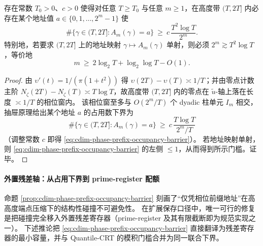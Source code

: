 \begin{proposition}[二次分辨率屏障的占用下界与单射门槛]\label{prop:cdim-phase-prefix-occupancy-barrier}
存在常数 \(T_0>0\)、\(c>0\) 使得对任意 \(T\ge T_0\) 与任意 \(m\ge 1\)，在高度带 \((T,2T]\) 内必存在某个地址值 \(a\in\{0,1,\dots,2^m-1\}\) 使
\begin{equation}\label{eq:cdim-phase-prefix-occupancy-barrier}
\#\{\gamma\in(T,2T]:A_m(\gamma)=a\}\ \ge\ c\,\frac{T^2\log T}{2^m}.
\end{equation}
特别地，若要求 \((T,2T]\) 上的地址映射 \(\gamma\mapsto A_m(\gamma)\) 单射，则必须 \(2^m\gtrsim T^2\log T\)，等价地
\[
m\ \ge\ 2\log_2T+\log_2\log T-O(1).
\]
\end{proposition}
\begin{proof}
由 \(\upsilon'(t)=1/(\pi(1+t^2))\) 得 \(\upsilon(2T)-\upsilon(T)\asymp 1/T\)；并由零点计数主阶 \(N_\zeta(2T)-N_\zeta(T)\asymp T\log T\)，故高度带 \((T,2T]\) 内的零点在 \(\widetilde u\)-轴上落在长度 \(\asymp 1/T\) 的相位窗内。
该相位窗至多与 \(O(2^m/T)\) 个 dyadic 柱单元 \(I_m\) 相交，抽屉原理给出某个地址 \(a\) 的占用数下界为
\[
\#\{\gamma\in(T,2T]:A_m(\gamma)=a\}\ \ge\ c\,\frac{T\log T}{2^m/T}
\]
（调整常数 \(c\) 即得 \eqref{eq:cdim-phase-prefix-occupancy-barrier}）。
若地址映射单射，则 \eqref{eq:cdim-phase-prefix-occupancy-barrier} 的左侧 \(\le 1\)，从而得到所示门槛。证毕。
\end{proof}

\paragraph{外置残差轴：从占用下界到 prime-register 配额}
命题 \ref{prop:cdim-phase-prefix-occupancy-barrier} 刻画了“仅凭相位前缀地址”在高高度端点压缩下的结构性碰撞不可避免性。
在扩展保存口径中，唯一可行的修复是把碰撞完全移入外置残差寄存器（prime-register 及其有限截断即为规范实现之一）。
下述推论把 \eqref{eq:cdim-phase-prefix-occupancy-barrier} 直接翻译为残差寄存器的最小容量，并与 Quantile-CRT 的模积门槛合并为同一联合下界。

